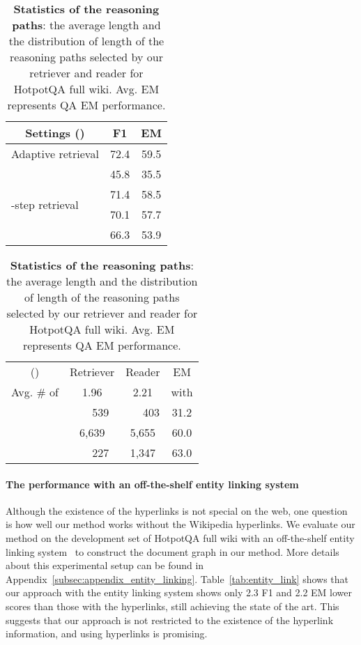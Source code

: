\documentclass{article} \usepackage{iclr2020_conference,times}
\begin{document}
\begin{table}[!tb]
\begin{minipage}{.46\linewidth}
\centering
    \small{
\begin{tabular}{ l | l | c | c }\toprule 
  \multicolumn{2}{c}{Settings ()} & F1 & EM \\
  \midrule
\multicolumn{2}{c|}{Adaptive retrieval} & 72.4 & 59.5 \\\hline
\multirow{4}{*}{-step retrieval } &  &  45.8 & 35.5  \\
  &  &  71.4 &  58.5 \\
&  &  70.1 &  57.7 \\
 &  &  66.3 &  53.9 \\
\bottomrule
\end{tabular}
\hspace{0.3cm}
\caption{{\bf Performance with different reasoning path length}: comparing the performance with different path length on HotpotQA full wiki. -step retrieval sets the number of the reasoning steps to a fixed number.
}\label{tab:fixed_length}
    }
\end{minipage}
\hspace{2mm}
\begin{minipage}{.49\linewidth}
\vspace{-0.1cm}
    \centering
    \small{
\begin{tabular}{c| c |c ||c }\toprule 
() & Retriever & Reader &  EM \\
\cmidrule{1-3}
Avg. \# of  & 1.96 & 2.21 & with \\
\midrule
 & ~~~539 & ~~~403 & 31.2 \\
 & 6,639 & 5,655 & 60.0\\
  & ~~~227 & 1,347 & 63.0 \\
\bottomrule
\end{tabular}
\caption{{\bf Statistics of the reasoning paths}: the average length and the distribution of length of the reasoning paths selected by our retriever and reader for HotpotQA full wiki. Avg. EM represents QA EM performance.
}\label{tab:comparison_num_retrieval}
    }
\end{minipage}
\end{table}

\vspace{-2mm}\paragraph{The performance with an off-the-shelf entity linking system}
Although the existence of the hyperlinks is not special on the web, one question is how well our method works without the Wikipedia hyperlinks.
We evaluate our method on the development set of HotpotQA full wiki with an off-the-shelf entity linking system~\citep{ferragina2011fast} to construct the document graph in our method.
More details about this experimental setup can be found in Appendix~\ref{subsec:appendix_entity_linking}. 
Table~\ref{tab:entity_link} shows that our approach with the entity linking system shows only 2.3 F1 and 2.2 EM lower scores than those with the hyperlinks, still achieving the state of the art.
This suggests that our approach is not restricted to the existence of the hyperlink information, and using hyperlinks is promising.
\end{document}
